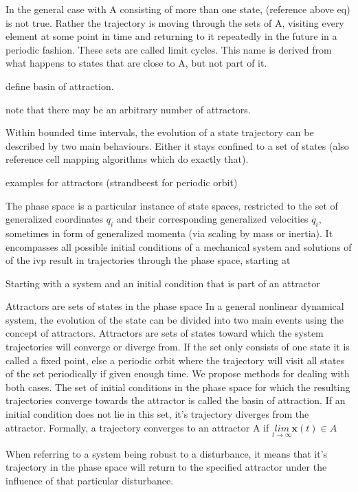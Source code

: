     In the general case with A consisting of more than one state, (reference above eq) is not true. Rather the trajectory is moving through the sets of A, visiting every element at some point in time and returning to it repeatedly in the future in a periodic fashion. These sets are called limit cycles. This name is derived from what happens to states that are close to A, but not part of it. 

    define basin of attraction. 

    note that there may be an arbitrary number of attractors. 

    Within bounded time intervals, the evolution of a state trajectory can be described by two main behaviours. Either it stays confined to a set of states   (also reference cell mapping algorithms which do exactly that).

    examples for attractors (strandbeest for periodic orbit) 


    The phase space is a particular instance of state spaces, restricted to the set of generalized coordinates $q_i$ and their corresponding generalized velocities $\dot{q_i}$, sometimes in form of generalized momenta (via scaling by mass or inertia). It encompasses all possible initial conditions of a mechanical system and solutions of of the ivp result in trajectories through the phase space, starting at 


    Starting with a system and an initial condition that is part of an attractor 

    Attractors are sets of states in the phase space
    In a general nonlinear dynamical system, the evolution of the state can be divided into two main events using the concept of attractors. Attractors are sets of states toward which the system trajectories will converge or diverge from. If the set only consists of one state it is called a fixed point, else a periodic orbit where the trajectory will visit all states of the set periodically if given enough time. 
    We propose methods for dealing with both cases. 
    The set of initial conditions in the phase space for which the resulting trajectories converge towards the attractor is called the basin of attraction. If an initial condition does not lie in this set, it's trajectory diverges from the attractor. 
    Formally, a trajectory converges to an attractor A if $\underset{t \rightarrow \infty}{lim}\mathbf{x}(t) \in A$ 

    When referring to a system being robust to a disturbance, it means that it's trajectory in the phase space will return to the specified attractor under the influence of that particular disturbance. 

